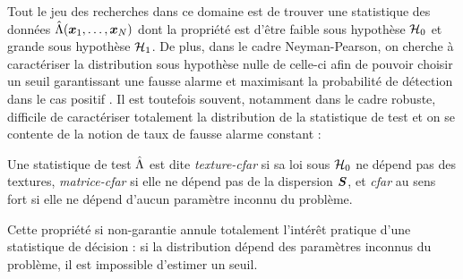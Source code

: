 Tout le jeu des recherches dans ce domaine est de trouver une statistique des données $\hat{\Lambda}(\boldsymbol{x}_1,\dots,\boldsymbol{x}_N)$ dont la propriété est d'être faible sous hypothèse $\mathcal{H}_0$ et grande sous hypothèse $\mathcal{H}_1$. De plus, dans le cadre Neyman-Pearson, on cherche à caractériser la distribution sous hypothèse nulle de celle-ci afin de pouvoir choisir un seuil garantissant une fausse alarme et maximisant la probabilité de détection dans le cas positif . Il est toutefois souvent, notamment dans le cadre robuste, difficile de caractériser totalement la distribution de la statistique de test et on se contente de la notion de taux de fausse alarme constant :



\begin{definition}
\label{def:detection-cfar}
  Une statistique de test $\hat{\Lambda}$ est dite \emph{texture-cfar} si sa loi sous $\mathcal{H}_0$ ne dépend pas des textures, \emph{matrice-cfar} si elle ne dépend pas de la dispersion $\boldsymbol{S}$, et \emph{cfar} au sens fort si elle ne dépend d'aucun paramètre inconnu du problème.
\end{definition}

Cette propriété si non-garantie annule totalement l'intérêt pratique d'une statistique de décision : si la distribution dépend des paramètres inconnus du problème, il est impossible d'estimer un seuil.

